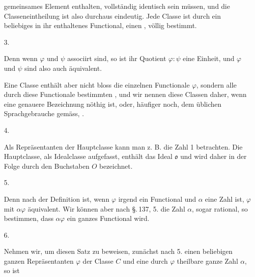 gemeinsames Element enthalten, vollständig identisch sein müssen, und die Classeneintheilung ist also durchaus eindeutig. Jede Classe ist durch ein beliebiges in ihr enthaltenes Functional, einen , völlig bestimmt.

3. 

Denn wenn $\varphi$ und $\psi$ associirt sind, so ist ihr Quotient $\varphi:\psi$ eine Einheit, und $\varphi$ und $\psi$ sind also auch äquivalent.

Eine Classe enthält aber nicht bloss die einzelnen Functionale $\varphi$, sondern alle durch diese Functionale bestimmten , und wir nennen diese Classen daher, wenn eine genauere Bezeichnung nöthig ist,  oder, häufiger noch, dem üblichen Sprachgebrauche gemäss, .

4. 

Als Repräsentanten der Hauptclasse kann man z. B. die Zahl 1 betrachten. Die Hauptclasse, als Idealclasse aufgefasst, enthält das Ideal $\mathfrak{o}$ und wird daher in der Folge durch den Buchstaben $O$ bezeichnet.

5. 

Denn nach der Definition ist, wenn $\varphi$ irgend ein Functional und $\alpha$ eine Zahl ist, $\varphi$ mit $\alpha\varphi$ äquivalent. Wir können aber nach \S.\,137, 5. die Zahl $\alpha$, sogar rational, so bestimmen, dass $\alpha\varphi$ ein ganzes Functional wird.

6. 

Nehmen wir, um diesen Satz zu beweisen, zunächst nach 5. einen beliebigen ganzen Repräsentanten $\varphi$ der Classe $C$ und eine durch $\varphi$ theilbare ganze Zahl $\alpha$, so ist

